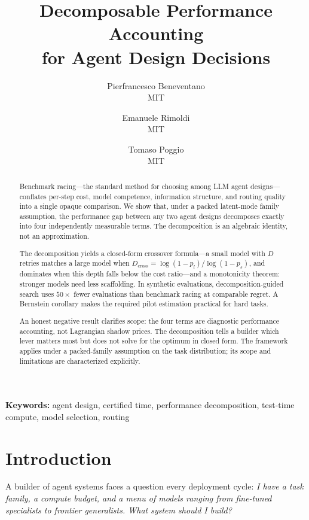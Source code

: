 \documentclass[twoside,11pt]{article}
\title{Decomposable Performance Accounting\\for Agent Design Decisions}
\author{Pierfrancesco Beneventano \\ MIT
\and Emanuele Rimoldi \\ MIT
\and Tomaso Poggio \\ MIT}
\newenvironment{keywords}{\par\smallskip\noindent\textbf{Keywords: }}{\par\smallskip}
\newcommand{\Dcross}{D_{\mathrm{cross}}}
\begin{document}
\maketitle

\begin{abstract}
Benchmark racing---the standard method for choosing among LLM agent designs---conflates per-step cost, model competence, information structure, and routing quality into a single opaque comparison.
We show that, under a packed latent-mode family assumption, the performance gap between any two agent designs decomposes exactly into four independently measurable terms.
The decomposition is an algebraic identity, not an approximation.

The decomposition yields a closed-form crossover formula---a small model with $D$ retries matches a large model when $\Dcross = \log(1-p_l)/\log(1-p_s)$, and dominates when this depth falls below the cost ratio---and a monotonicity theorem: stronger models need less scaffolding.
In synthetic evaluations, decomposition-guided search uses $50\times$ fewer evaluations than benchmark racing at comparable regret.
A Bernstein corollary makes the required pilot estimation practical for hard tasks.

An honest negative result clarifies scope: the four terms are diagnostic performance accounting, not Lagrangian shadow prices.
The decomposition tells a builder which lever matters most but does not solve for the optimum in closed form.
The framework applies under a packed-family assumption on the task distribution; its scope and limitations are characterized explicitly.
\end{abstract}

\begin{keywords}
agent design, certified time, performance decomposition, test-time compute, model selection, routing
\end{keywords}

\section{Introduction}
\label{sec:intro}

A builder of agent systems faces a question every deployment cycle: \emph{I have a task family, a compute budget, and a menu of models ranging from fine-tuned specialists to frontier generalists.
What system should I build?}
\end{document}
